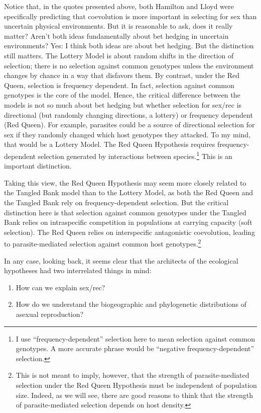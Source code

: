 \documentclass[
  american,
  letterpaper,
]{book}
\providecommand{\tightlist}{%
  \setlength{\itemsep}{0pt}\setlength{\parskip}{0pt}}\usepackage{longtable,booktabs,array}
\begin{document}
Notice that, in the quotes presented above, both Hamilton and Lloyd were
specifically predicting that coevolution is more important in selecting
for sex than uncertain physical environments. But it is reasonable to
ask, does it really matter? Aren't both ideas fundamentally about bet
hedging in uncertain environments? Yes: I think both ideas are about bet
hedging. But the distinction still matters. The Lottery Model is about
random shifts in the direction of selection; there is no selection
against common genotypes unless the environment changes by chance in a
way that disfavors them. By contrast, under the Red Queen, selection is
frequency dependent. In fact, selection against common genotypes is the
core of the model. Hence, the critical difference between the models is
not so much about bet hedging but whether selection for sex/rec is
directional (but randomly changing directions, a lottery) or frequency
dependent (Red Queen). For example, parasites could be a source of
directional selection for sex if they randomly changed which host
genotypes they attacked. To my mind, that would be a Lottery Model. The
Red Queen Hypothesis requires frequency-dependent selection generated by
interactions between species.\footnote{I use ``frequency-dependent''
  selection here to mean selection against common genotypes. A more
  accurate phrase would be ``negative frequency-dependent'' selection.}
This is an important distinction.

Taking this view, the Red Queen Hypothesis may seem more closely related
to the Tangled Bank model than to the Lottery Model, as both the Red
Queen and the Tangled Bank rely on frequency-dependent selection. But
the critical distinction here is that selection against common genotypes
under the Tangled Bank relies on intraspecific competition in
populations at carrying capacity (soft selection). The Red Queen relies
on interspecific antagonistic coevolution, leading to parasite-mediated
selection against common host genotypes.\footnote{This is not meant to
  imply, however, that the strength of parasite-mediated selection under
  the Red Queen Hypothesis must be independent of population size.
  Indeed, as we will see, there are good reasons to think that the
  strength of parasite-mediated selection depends on host density.}

In any case, looking back, it seems clear that the architects of the
ecological hypotheses had two interrelated things in mind:

\begin{enumerate}
\def\labelenumi{\arabic{enumi}.}
\tightlist
\item
  How can we explain sex/rec?
\item
  How do we understand the biogeographic and phylogenetic distributions
  of asexual reproduction?
\end{enumerate}
\end{document}
